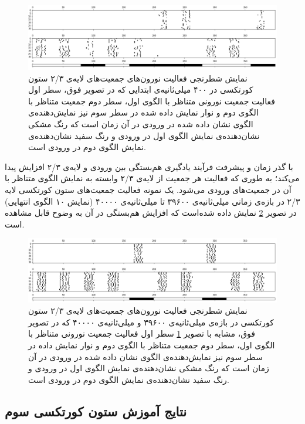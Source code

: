 \documentclass[12pt]{report}
\begin{document}
	\begin{figure}[H]
		\centering
		\includegraphics[width=1.0\linewidth]{c1-begining.png}
		\caption[NS]{
			نمایش شطرنجی فعالیت نورون‌های جمعیت‌های لایه‌ی ۲/۳ ستون کورتکسی در ۴۰۰ میلی‌ثانیه‌ی ابتدایی که در تصویر فوق، سطر اول فعالیت جمعیت نورونی متناظر با الگوی اول، سطر دوم جمعیت متناظر با الگوی دوم و نوار نمایش داده شده در سطر سوم نیز نمایش‌دهنده‌ی الگوی نشان داده شده در ورودی در آن زمان است که رنگ مشکی نشان‌‌دهنده‌ی نمایش الگوی اول در ورودی و رنگ سفید نشان‌دهنده‌ی نمایش الگوی دوم در ورودی است.
		}
		\label{fig:c1-begining} 
	\end{figure}
	
	با گذر زمان و پیشرفت فرآیند یادگیری هم‌بستگی بین ورودی و لایه‌ی ۲/۳ افزایش پیدا می‌کند؛ به طوری که فعالیت هر جمعیت از لایه‌ی ۲/۳ وابسته به نمایش الگوی متناظر با آن در جمعیت‌های ورودی می‌شود. یک نمونه فعالیت جمعیت‌های ستون کورتکسی لایه‌ ۲/۳ در بازه‌ی زمانی میلی‌ثانیه‌ی ۳۹۶۰۰ تا میلی‌ثانیه‌ی ۴۰۰۰۰ (نمایش ۱۰ الگوی انتهایی) در تصویر \ref{fig:c1-final} نمایش داده شده‌است که افزایش هم‌بستگی در آن به وضوح قابل مشاهده است.
	
	\begin{figure}[H]
		\centering
		\includegraphics[width=1.0\linewidth]{c1-final.png}
		\caption[NS]{
			نمایش شطرنجی فعالیت نورون‌های جمعیت‌های لایه‌ی ۲/۳ ستون کورتکسی در بازه‌ی میلی‌ثانیه‌ی ۳۹۶۰۰ و میلی‌ثانیه‌ی ۴۰۰۰۰ که در تصویر فوق، مشابه با تصویر \ref{fig:c1-begining} سطر اول فعالیت جمعیت نورونی متناظر با الگوی اول، سطر دوم جمعیت متناظر با الگوی دوم و نوار نمایش داده در سطر سوم نیز نمایش‌دهنده‌ی الگوی نشان داده شده در ورودی در آن زمان است که رنگ مشکی نشان‌‌دهنده‌ی نمایش الگوی اول در ورودی و رنگ سفید نشان‌دهنده‌ی نمایش الگوی دوم در ورودی است.
		}
		\label{fig:c1-final} 
	\end{figure}
	
	\subsection{نتایج آموزش ستون کورتکسی سوم}
	
\end{document}
